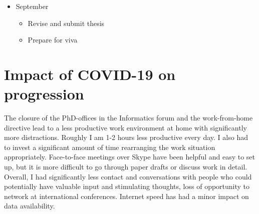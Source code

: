 \documentclass[a4paper,12pt,twoside]{article}
\begin{document}
\begin{itemize}
\item September
\begin{itemize}
\item Revise and submit thesis
\item Prepare for viva
\end{itemize}

\end{itemize}

\section{Impact of COVID-19 on progression}

The closure of the PhD-offices in the Informatics forum and the work-from-home directive lead to a less productive work environment at home with significantly more distractions. Roughly I am 1-2 hours less productive every day. I also had to invest a significant amount of time rearranging the work situation appropriately.
Face-to-face meetings over Skype have been helpful and easy to set up, but it is more difficult to go through paper drafts or discuss work  in detail. 
Overall, I had significantly less contact and conversations with people who could potentially have valuable input and stimulating thoughts, loss of opportunity to network at international conferences.
Internet speed has had a minor impact on data availability.


%
%
\end{document}
